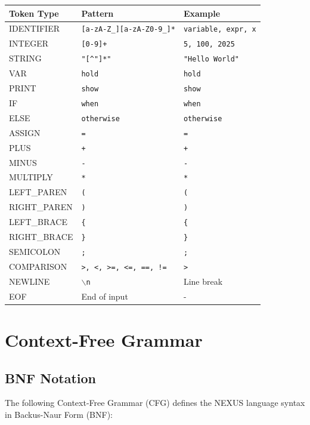 \documentclass[12pt,a4paper]{report}
\begin{document}
\begin{center}
\begin{tabular}{|l|l|l|}
\hline
\textbf{Token Type} & \textbf{Pattern} & \textbf{Example} \\
\hline
IDENTIFIER & \texttt{[a-zA-Z\_][a-zA-Z0-9\_]*} & \texttt{variable, expr, x} \\
\hline
INTEGER & \texttt{[0-9]+} & \texttt{5, 100, 2025} \\
\hline
STRING & \texttt{"[^"]*"} & \texttt{"Hello World"} \\
\hline
VAR & \texttt{hold} & \texttt{hold} \\
\hline
PRINT & \texttt{show} & \texttt{show} \\
\hline
IF & \texttt{when} & \texttt{when} \\
\hline
ELSE & \texttt{otherwise} & \texttt{otherwise} \\
\hline
ASSIGN & \texttt{=} & \texttt{=} \\
\hline
PLUS & \texttt{+} & \texttt{+} \\
\hline
MINUS & \texttt{-} & \texttt{-} \\
\hline
MULTIPLY & \texttt{*} & \texttt{*} \\
\hline
LEFT\_PAREN & \texttt{(} & \texttt{(} \\
\hline
RIGHT\_PAREN & \texttt{)} & \texttt{)} \\
\hline
LEFT\_BRACE & \texttt{\{} & \texttt{\{} \\
\hline
RIGHT\_BRACE & \texttt{\}} & \texttt{\}} \\
\hline
SEMICOLON & \texttt{;} & \texttt{;} \\
\hline
COMPARISON & \texttt{>, <, >=, <=, ==, !=} & \texttt{>} \\
\hline
NEWLINE & \texttt{$\backslash$n} & Line break \\
\hline
EOF & End of input & - \\
\hline
\end{tabular}
\end{center}

\chapter{Context-Free Grammar}

\section{BNF Notation}
The following Context-Free Grammar (CFG) defines the NEXUS language syntax in Backus-Naur Form (BNF):
\end{document}
